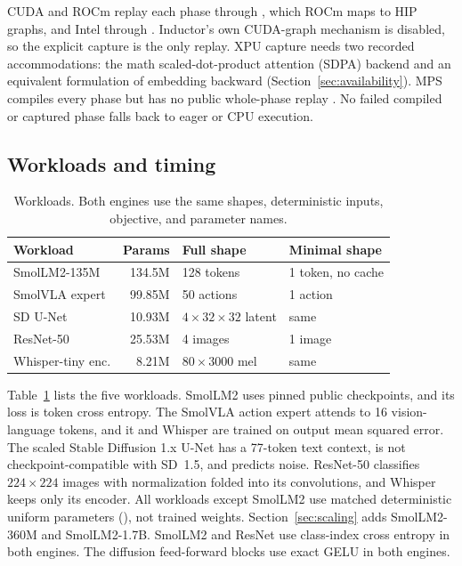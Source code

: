 \documentclass[conference]{IEEEtran}
\begin{document}
CUDA and ROCm replay each phase through , which
ROCm maps to HIP graphs, and Intel through 
\cite{pytorch2026hip,pytorch2026xpugraph}. Inductor's own CUDA-graph
mechanism is disabled, so the explicit capture is the only replay. XPU
capture needs two recorded accommodations: the math scaled-dot-product
attention (SDPA) backend and an equivalent formulation of embedding backward
(Section~\ref{sec:availability}). MPS compiles every phase but has no public
whole-phase replay \cite{pytorch2026mpssource}. No failed compiled or
captured phase falls back to eager or CPU execution.

\subsection{Workloads and timing}

\begin{table}[t]
\caption{Workloads. Both engines use the same shapes, deterministic inputs,
objective, and parameter names.}
\label{tab:workloads}
\centering
\footnotesize
\setlength{\tabcolsep}{3pt}
\begin{tabular}{lrll}
\toprule
Workload & Params & Full shape & Minimal shape \\
\midrule
SmolLM2-135M \cite{benallal2025smollm2} & 134.5M & 128 tokens & 1 token, no cache \\
SmolVLA expert \cite{shukor2025smolvla} & 99.85M & 50 actions & 1 action \\
SD U-Net \cite{rombach2022ldm} & 10.93M & $4{\times}32{\times}32$ latent & same \\
ResNet-50 \cite{he2016resnet} & 25.53M & 4 images & 1 image \\
Whisper-tiny enc. \cite{radford2022whisper} & 8.21M & $80{\times}3000$ mel & same \\
\bottomrule
\end{tabular}
\end{table}

Table~\ref{tab:workloads} lists the five workloads. SmolLM2 uses pinned
public checkpoints, and its loss is token cross entropy. The SmolVLA action
expert attends to 16 vision-language tokens, and it and Whisper are trained
on output mean squared error. The scaled Stable Diffusion 1.x U-Net has a
77-token text context, is not checkpoint-compatible with SD~1.5, and predicts
noise. ResNet-50 classifies $224\times224$ images with normalization folded
into its convolutions, and Whisper keeps only its encoder. All workloads
except SmolLM2 use matched deterministic uniform parameters
(), not trained weights. Section~\ref{sec:scaling}
adds SmolLM2-360M and SmolLM2-1.7B. SmolLM2 and ResNet use
class-index cross entropy in both engines. The diffusion feed-forward blocks
use exact GELU in both engines.
\end{document}
